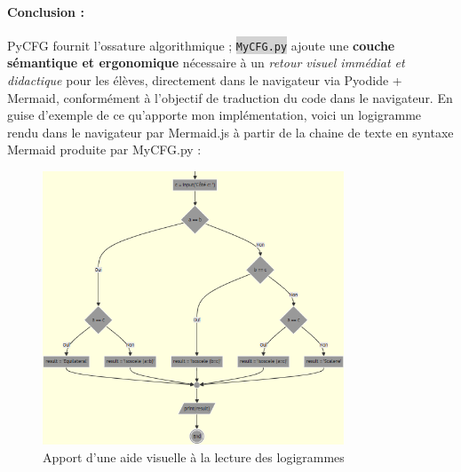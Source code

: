 \documentclass[11pt,a4paper]{article}
\newcommand{\code}[1]{\colorbox{lightgray}{\texttt{\small #1}}}
\begin{document}
\paragraph{Conclusion :} PyCFG fournit l'ossature algorithmique ; \code{MyCFG.py} ajoute une \textbf{couche sémantique et ergonomique} nécessaire à un \textit{retour visuel immédiat et didactique} pour les élèves, directement dans le navigateur via Pyodide + Mermaid, conformément à l'objectif de traduction du code dans le navigateur.
En guise d'exemple de ce qu'apporte mon implémentation, voici un logigramme rendu dans le navigateur par Mermaid.js à partir de la chaine de texte en syntaxe Mermaid produite par MyCFG.py :
\begin{figure}[H]
    \centering
    \includegraphics[width=0.8\textwidth, keepaspectratio]{noeud_jonction.png}
    \caption{Apport d'une aide visuelle à la lecture des logigrammes}
    \label{fig_jonctions}
\end{figure} 
 
\end{document}
